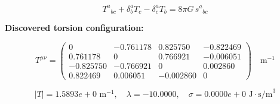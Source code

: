 
\begin{equation}
  T^a{}_{bc} + \delta^a_b T_c - \delta^a_c T_b = 8\pi G \, s^a{}_{bc}
\end{equation}

\textbf{Discovered torsion configuration:}

\begin{equation}
  T^{\mu\nu} = \begin{pmatrix}
    0 & -0.761178 & 0.825750 & -0.822469 \\
    0.761178 & 0 & 0.766921 & -0.006051 \\
    -0.825750 & -0.766921 & 0 & 0.002860 \\
    0.822469 & 0.006051 & -0.002860 & 0
  \end{pmatrix} \quad \text{m}^{-1}
\end{equation}

\begin{equation}
  |T| = 1.5893e+0 \text{ m}^{-1}, \quad
  \lambda = -10.0000, \quad
  \sigma = 0.0000e+0 \text{ J}\cdot\text{s/m}^3
\end{equation}